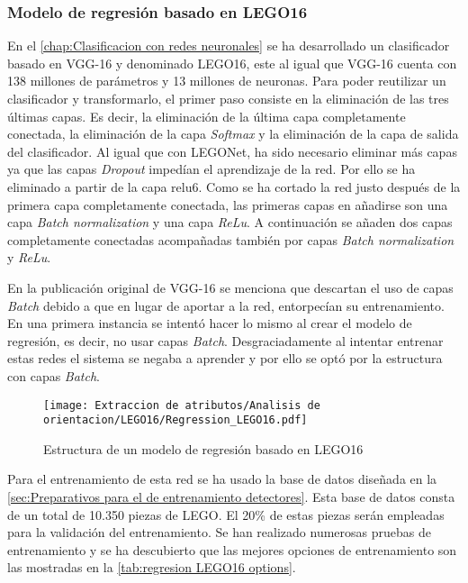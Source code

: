 \subsubsection*{Modelo de regresión basado en LEGO16}
En el \autoref{chap:Clasificacion con redes neuronales} se ha desarrollado un clasificador basado en VGG-16 y denominado LEGO16, este al igual que VGG-16 cuenta con 138 millones de parámetros y 13 millones de neuronas. Para poder reutilizar un clasificador y transformarlo, el primer paso consiste en la eliminación de las tres últimas capas. Es decir, la eliminación de la última capa completamente conectada, la eliminación de la capa \textit{Softmax} y la eliminación de la capa de salida del clasificador. Al igual que con LEGONet, ha sido necesario eliminar más capas ya que las capas \textit{Dropout} impedían el aprendizaje de la red. Por ello se ha eliminado a partir de la capa relu6. Como se ha cortado la red justo después de la primera capa completamente conectada, las primeras capas en añadirse son una capa \textit{Batch normalization} y una capa \textit{ReLu}. A continuación se añaden dos capas completamente conectadas acompañadas también por capas \textit{Batch normalization} y \textit{ReLu}.

En la publicación original de VGG-16 \citep{VGG16} se menciona que descartan el uso de capas \textit{Batch} debido a que en lugar de aportar a la red, entorpecían su entrenamiento. En una primera instancia se intentó hacer lo mismo al crear el modelo de regresión, es decir, no usar capas \textit{Batch}. Desgraciadamente al intentar entrenar estas redes el sistema se negaba a aprender y por ello se optó por la estructura con capas \textit{Batch}.

\begin{figure}[ht]
	\centering
	\texttt{[image: Extraccion de atributos/Analisis de orientacion/LEGO16/Regression\_LEGO16.pdf]}
	\caption{Estructura de un modelo de regresión basado en LEGO16}
	\label{fig:regresion LEGO16 estructura}
	\vspace{-5pt}
\end{figure}

Para el entrenamiento de esta red se ha usado la base de datos diseñada en la \autoref{sec:Preparativos para el de entrenamiento detectores}. Esta base de datos consta de un total de 10.350 piezas de LEGO. El 20\% de estas piezas serán empleadas para la validación del entrenamiento. Se han realizado numerosas pruebas de entrenamiento y se ha descubierto que las mejores opciones de entrenamiento son las mostradas en la \autoref{tab:regresion LEGO16 options}.


